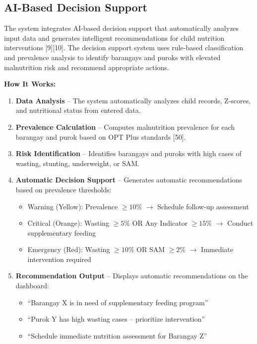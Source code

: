 \documentclass[12pt, a4paper]{report}
\begin{document}
\subsection{AI-Based Decision Support}
\label{subsec:aidss}
The system integrates AI-based decision support that automatically analyzes input data and generates intelligent recommendations for child nutrition interventions [9][10]. The decision support system uses rule-based classification and prevalence analysis to identify barangays and puroks with elevated malnutrition risk and recommend appropriate actions.

\noindent \textbf{How It Works:}
\begin{enumerate}
    \item \textbf{Data Analysis} -- The system automatically analyzes child records, Z-scores, and nutritional status from entered data.
    \item \textbf{Prevalence Calculation} -- Computes malnutrition prevalence for each barangay and purok based on OPT Plus standards [50].
    \item \textbf{Risk Identification} -- Identifies barangays and puroks with high cases of wasting, stunting, underweight, or SAM.
    \item \textbf{Automatic Decision Support} -- Generates automatic recommendations based on prevalence thresholds:
    \begin{itemize}
        \item Warning (Yellow): Prevalence \(\geq 10\%\) \(\rightarrow\) Schedule follow-up assessment
        \item Critical (Orange): Wasting \(\geq 5\%\) OR Any Indicator \(\geq 15\%\) \(\rightarrow\) Conduct supplementary feeding
        \item Emergency (Red): Wasting \(\geq 10\%\) OR SAM \(\geq 2\%\) \(\rightarrow\) Immediate intervention required
    \end{itemize}
    \item \textbf{Recommendation Output} -- Displays automatic recommendations on the dashboard:
    \begin{itemize}
        \item ``Barangay X is in need of supplementary feeding program''
        \item ``Purok Y has high wasting cases -- prioritize intervention''
        \item ``Schedule immediate nutrition assessment for Barangay Z''
    \end{itemize}
\end{enumerate}
\end{document}
